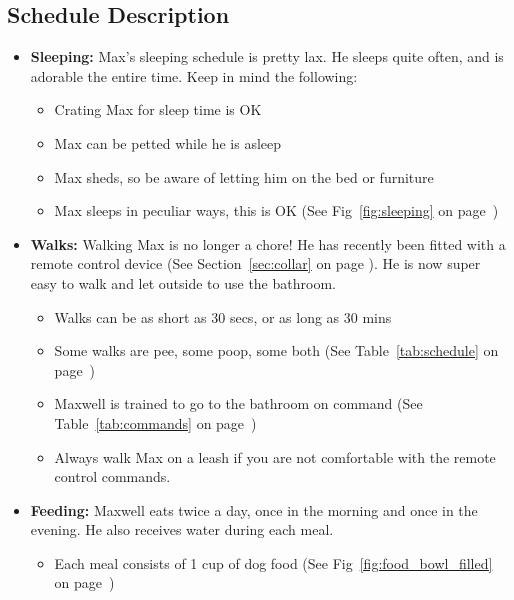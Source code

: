 \documentclass[pdftex,12pt]{article}
\begin{document}
\pagebreak

\subsection{Schedule Description}
\begin{itemize}\label{itm:schedule}
    \item \textbf{Sleeping:} Max's sleeping schedule is pretty lax. He sleeps 
        quite often, and is adorable the entire time. Keep in mind the following:
        \begin{itemize}
            \item Crating Max for sleep time is OK
            \item Max can be petted while he is asleep
            \item Max sheds, so be aware of letting him on the bed or furniture
            \item Max sleeps in peculiar ways, this is OK
                (See Fig~\ref{fig:sleeping} on page~\pageref{fig:sleeping})
        \end{itemize}
    \item \textbf{Walks:} Walking Max is no longer a chore! He has recently been fitted
        with a remote control device (See Section~\ref{sec:collar} on page \pageref{sec:collar}).
        He is now super easy to walk and let outside to use the bathroom.
        \begin{itemize}
            \item Walks can be as short as 30 secs, or as long as 30 mins
            \item Some walks are pee, some poop, some both
                (See Table~\ref{tab:schedule} on page~\pageref{tab:schedule})
            \item Maxwell is trained to go to the bathroom on command
                (See Table~\ref{tab:commands} on page~\pageref{tab:commands})
            \item Always walk Max on a leash if you are not comfortable with the remote control commands.
        \end{itemize}
    \item \textbf{Feeding:} Maxwell eats twice a day, once in the morning and
        once in the evening. He also receives water during each meal.
        \begin{itemize}
            \item Each meal consists of 1 cup of dog food
                (See Fig~\ref{fig:food_bowl_filled} on
                page~\pageref{fig:food_bowl_filled})

\end{itemize}
\end{itemize}
\end{document}
